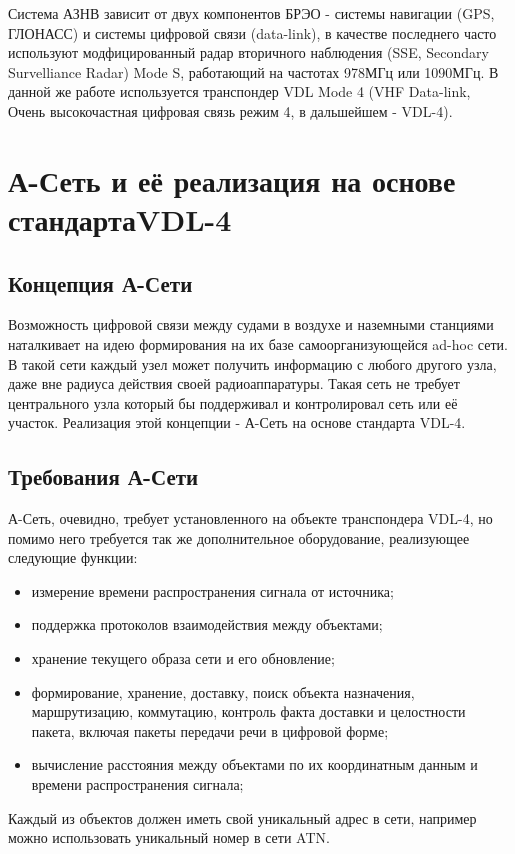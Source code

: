 \documentclass[a4paper,12pt]{report} %
\begin{document}
Система АЗНВ зависит от двух компонентов БРЭО - системы навигации (GPS, ГЛОНАСС)
и системы цифровой связи (data-link), в качестве последнего часто используют
модфицированный радар вторичного наблюдения (SSE, Secondary Survelliance Radar)
Mode S, работающий на частотах 978МГц или 1090МГц. В данной же работе
используется транспондер VDL Mode 4 (VHF Data-link, Очень высокочастная цифровая
связь режим 4, в дальшейшем - VDL-4).
\newpage
\chapter{А-Сеть и её реализация на основе стандарта\newline VDL-4} %

\section{Концепция А-Сети}
Возможность цифровой связи между судами в воздухе и наземными станциями
наталкивает на идею формирования на их базе самоорганизующейся ad-hoc сети. В
такой сети каждый узел может получить информацию с любого другого узла, даже вне
радиуса действия своей радиоаппаратуры. Такая сеть не требует центрального узла
который бы поддерживал и контролировал сеть или её участок. Реализация этой
концепции - А-Сеть на основе стандарта VDL-4.

\section{Требования А-Сети}
А-Сеть, очевидно, требует установленного на объекте транспондера VDL-4, но
помимо него требуется так же дополнительное оборудование, реализующее следующие
функции:
\begin{itemize}
\item измерение времени распространения сигнала от источника;
\item поддержка протоколов взаимодействия между объектами;
\item хранение текущего образа сети и его обновление;
\item формирование, хранение, доставку, поиск объекта назначения, маршрутизацию,
  коммутацию, контроль факта доставки и целостности пакета, включая пакеты
  передачи речи в цифровой форме;
\item вычисление расстояния между объектами по их координатным данным и времени
  распространения сигнала;
\end{itemize}

Каждый из объектов должен иметь свой уникальный адрес в сети, например можно
использовать уникальный номер в сети ATN.
\end{document}
